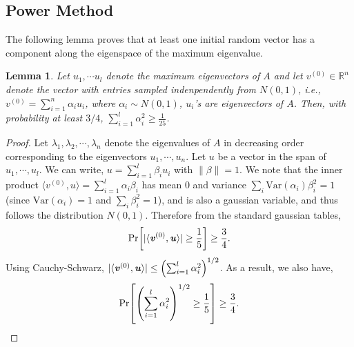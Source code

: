 \documentclass[11pt]{article}
\newtheorem{lemma}[theorem]{Lemma}
\let\originalleft\left
\let\originalright\right
\renewcommand{\left}{\mathopen{}\mathclose\bgroup\originalleft}
\renewcommand{\right}{\aftergroup\egroup\originalright}
\newcommand\uu{\boldsymbol{\mathit{u}}}
\newcommand\vv{\boldsymbol{\mathit{v}}}
\renewcommand\AA{\boldsymbol{\mathit{A}}}
\newcommand\Var{\mathrm{Var}}
\begin{document}
\subsection*{Power Method}

The following lemma proves that at least one initial random vector has a component along the eigenspace of the maximum eigenvalue.
\begin{lemma}\label{lem:PMHighComp}
Let $\uu_1,\cdots \uu_l$ denote the maximum eigenvectors of $\AA$ and let $\vv^{(0)} \in \mathbb{R}^n$ denote the vector with entries sampled indenpendently from $N(0,1)$, i.e., $\vv^{(0)} = \sum_{i=1}^n\alpha_i\uu_i$, where $\alpha_i \sim N(0,1)$, $\uu_i$'s are eigenvectors of $\AA$. Then, with probability at least $3/4$, $\sum_{i=1}^l\alpha_i^2 \geq \frac{1}{25}$.
\end{lemma}
\begin{proof}
Let $\lambda_1,\lambda_2,\cdots, \lambda_n$ denote the eigenvalues of $\AA$ in decreasing order corresponding to the eigenvectors $\uu_1,\cdots, \uu_n$.  Let $\uu$ be a vector in the span of $\uu_1,\cdots, \uu_l$. We can write, $\uu=\sum_{i=1}^l \beta_i\uu_i$ with $\|\beta\| = 1$. We note that the inner product $\langle \vv^{(0)},\uu\rangle = \sum_{i=1}^l \alpha_i \beta_i$ has mean $0$ and variance $\sum_i \Var(\alpha_i)\beta_i^2 = 1$ (since $\Var(\alpha_i) =1$ and $\sum_i \beta_i^2 = 1$), and is also a gaussian variable, and thus follows the distribution $N(0,1)$. Therefore from the standard gaussian tables, 
\[
\Pr\left[|\langle \vv^{(0)},\uu\rangle|\geq \frac{1}{5}\right] \geq \frac{3}{4}.
\]
Using Cauchy-Schwarz, $|\langle \vv^{(0)},\uu\rangle| \leq \left(\sum_{i=1}^l\alpha_i^2\right)^{1/2}$. As a result, we also have,
\[
\Pr\left[\left(\sum_{i=1}^l\alpha_i^2\right)^{1/2}\geq \frac{1}{5}\right] \geq \frac{3}{4}.
\] 
\end{proof}
\end{document}
